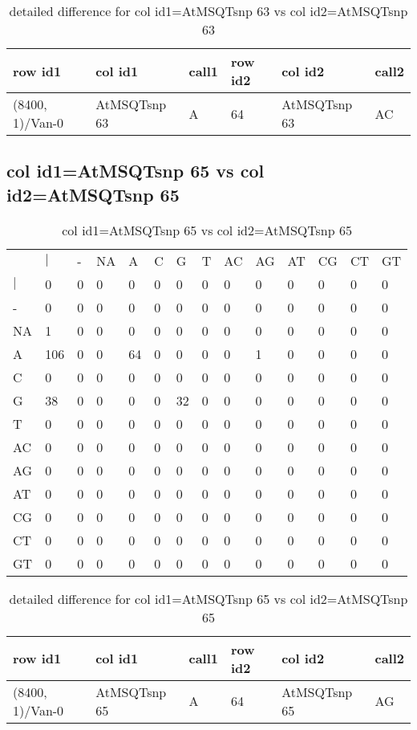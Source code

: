 \begin{center}
\begin{longtable}{|l|l|l|l|l|l|}
\caption{detailed difference for col id1=AtMSQTsnp 63 vs col id2=AtMSQTsnp 63} \label{table_dm755}\\
\hline
row id1&col id1&call1&row id2&col id2&call2\\
\hline
(8400, 1)/Van-0&AtMSQTsnp 63&A&64&AtMSQTsnp 63&AC\\
\hline
\end{longtable}
\end{center}

\subsection{col id1=AtMSQTsnp 65 vs col id2=AtMSQTsnp 65}
\begin{center}
\begin{longtable}{|l|l|l|l|l|l|l|l|l|l|l|l|l|l|}
\caption{col id1=AtMSQTsnp 65 vs col id2=AtMSQTsnp 65} \label{table_dm756}\\
\hline
\\
\hline
&$|$&-&NA&A&C&G&T&AC&AG&AT&CG&CT&GT\\
$|$&0&0&0&0&0&0&0&0&0&0&0&0&0\\
-&0&0&0&0&0&0&0&0&0&0&0&0&0\\
NA&1&0&0&0&0&0&0&0&0&0&0&0&0\\
A&106&0&0&64&0&0&0&0&1&0&0&0&0\\
C&0&0&0&0&0&0&0&0&0&0&0&0&0\\
G&38&0&0&0&0&32&0&0&0&0&0&0&0\\
T&0&0&0&0&0&0&0&0&0&0&0&0&0\\
AC&0&0&0&0&0&0&0&0&0&0&0&0&0\\
AG&0&0&0&0&0&0&0&0&0&0&0&0&0\\
AT&0&0&0&0&0&0&0&0&0&0&0&0&0\\
CG&0&0&0&0&0&0&0&0&0&0&0&0&0\\
CT&0&0&0&0&0&0&0&0&0&0&0&0&0\\
GT&0&0&0&0&0&0&0&0&0&0&0&0&0\\
\hline
\end{longtable}
\end{center}

\begin{center}
\begin{longtable}{|l|l|l|l|l|l|}
\caption{detailed difference for col id1=AtMSQTsnp 65 vs col id2=AtMSQTsnp 65} \label{table_dm757}\\
\hline
row id1&col id1&call1&row id2&col id2&call2\\
\hline
(8400, 1)/Van-0&AtMSQTsnp 65&A&64&AtMSQTsnp 65&AG\\
\hline
\end{longtable}
\end{center}


